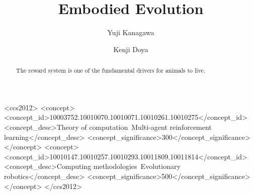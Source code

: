 \documentclass[sigconf]{acmart}
\begin{document}
\title{Embodied Evolution}

\author{Yuji Kanagawa}

\author{Kenji Doya}

\begin{abstract}
  The reward system is one of the fundamental drivers for animals to live.
\end{abstract}

\begin{CCSXML}
<ccs2012>
   <concept>
       <concept_id>10003752.10010070.10010071.10010261.10010275</concept_id>
       <concept_desc>Theory of computation~Multi-agent reinforcement learning</concept_desc>
       <concept_significance>300</concept_significance>
       </concept>
   <concept>
       <concept_id>10010147.10010257.10010293.10011809.10011814</concept_id>
       <concept_desc>Computing methodologies~Evolutionary robotics</concept_desc>
       <concept_significance>500</concept_significance>
       </concept>
 </ccs2012>
\end{CCSXML}




\maketitle
\end{document}
